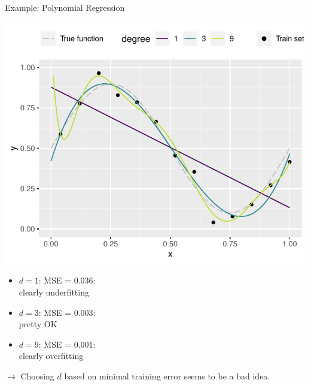 \begin{vbframe}{Example: Polynomial Regression}
\begin{minipage}[c]{0.6\textwidth}
  \includegraphics[width=\textwidth]{figure/eval_train_2} 
\end{minipage}%
\begin{minipage}[c]{0.4\textwidth}
  \begin{itemize}
    \footnotesize
    \item $d = 1$: MSE = 0.036: \\clearly underfitting
    \item $d = 3$: MSE = 0.003: \\pretty OK
    \item $d = 9$: MSE = 0.001: \\clearly overfitting
  \end{itemize}
\end{minipage}

\vfill

$\rightarrow$ Choosing $d$ based on minimal training error seems to be a bad 
idea.

\end{vbframe}


